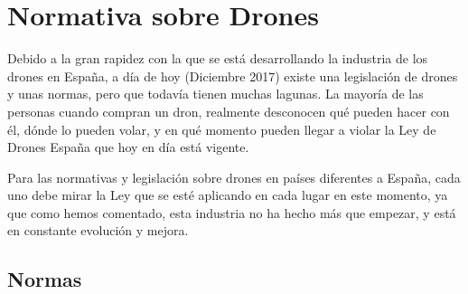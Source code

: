 \section{Normativa sobre Drones}
\label{sec:normativa}

Debido a la gran rapidez con la que se está desarrollando la industria de los drones en España, a día de hoy (Diciembre 2017) existe una legislación de drones y unas normas, pero que todavía tienen muchas lagunas. La mayoría de las personas cuando compran un dron, realmente desconocen qué pueden hacer con él, dónde lo pueden volar, y en qué momento pueden llegar a violar la Ley de Drones España que hoy en día está vigente.

Para las normativas y legislación sobre drones en países diferentes a España, cada uno debe mirar la Ley que se esté aplicando en cada lugar en este momento, ya que como hemos comentado, esta industria no ha hecho más que empezar, y está en constante evolución y mejora.

\subsection{Normas}

